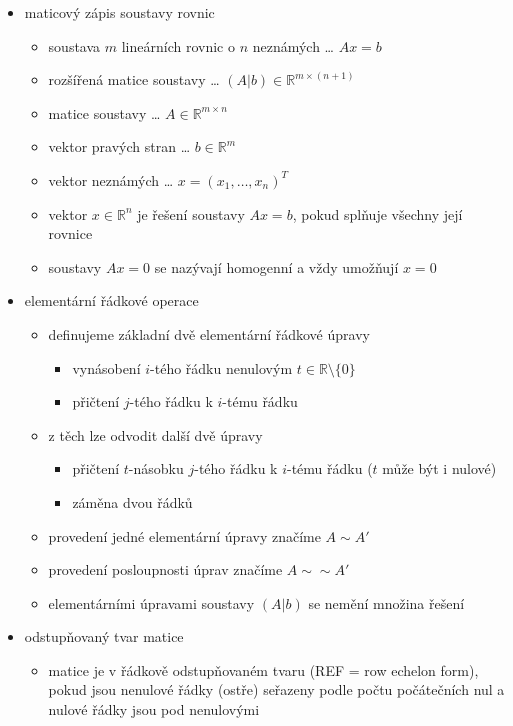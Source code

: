 \begin{itemize}
\begin{itemize}
\item maticový zápis soustavy rovnic
\begin{itemize}
\item soustava $m$ lineárních rovnic o $n$ neznámých \dots{} $Ax = b$
\item rozšířená matice soustavy \dots{} $(A|b) \in \mathbb{R}^{m\times (n+1)}$
\item matice soustavy \dots{} $A \in \mathbb{R}^{m\times n}$
\item vektor pravých stran \dots{} $b \in \mathbb{R}^m$
\item vektor neznámých \dots{} $x = (x_1,\dots,x_n)^T$
\item vektor $x \in \mathbb{R}^n$ je řešení soustavy $Ax = b$, pokud splňuje všechny její rovnice
\item soustavy $Ax = 0$ se nazývají homogenní a vždy umožňují $x = 0$
\end{itemize}
\item elementární řádkové operace
\begin{itemize}
\item definujeme základní dvě elementární řádkové úpravy
\begin{itemize}
\item vynásobení $i$-tého řádku nenulovým $t \in \mathbb R \setminus \lbrace0\rbrace$
\item přičtení $j$-tého řádku k $i$-tému řádku
\end{itemize}
\item z těch lze odvodit další dvě úpravy
\begin{itemize}
\item přičtení $t$-násobku $j$-tého řádku k $i$-tému řádku ($t$ může být i nulové)
\item záměna dvou řádků
\end{itemize}
\item provedení jedné elementární úpravy značíme $A\sim A'$
\item provedení posloupnosti úprav značíme $A\sim\sim A'$
\item elementárními úpravami soustavy $(A|b)$ se nemění množina řešení
\end{itemize}
\item odstupňovaný tvar matice
\begin{itemize}
\item matice je v řádkově odstupňovaném tvaru (REF = row echelon form), pokud jsou nenulové řádky (ostře) seřazeny podle počtu počátečních nul a nulové řádky jsou pod nenulovými

\end{itemize}
\end{itemize}
\end{itemize}
